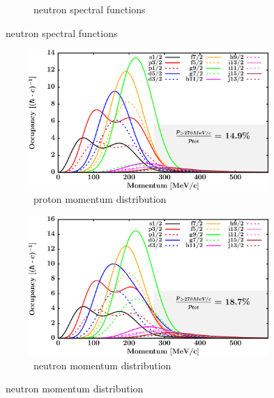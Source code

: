 \begin{figure}[hbtp]
\begin{subfigure}[b]{0.45\textwidth}
        \caption{\snTwelve\ neutron spectral functions}
        \label{DOMFitData_sn112_neutron_spectralFunctions}
    \end{subfigure}
\end{figure}
\afterpage{\clearpage}
\begin{figure}[hbtp]
    \captionsetup[subfigure]{labelformat=empty}
    \centering
    \begin{subfigure}[b]{0.45\textwidth}
        \centering
        \includegraphics[width=\linewidth]{figures/sn112_protonLJMomentumDistIntegral.png}
        \caption{\snTwelve\ proton momentum distribution}
        \label{DOMFitData_sn112_proton_momentumDist}
    \end{subfigure}\hspace{6pt}
    \begin{subfigure}[b]{0.45\textwidth}
        \centering
        \includegraphics[width=\linewidth]{figures/sn112_neutronLJMomentumDistIntegral.png}
        \caption{\snTwelve\ neutron momentum distribution}
        \label{DOMFitData_sn112_neutron_momentumDist}
    \end{subfigure}\vspace{0.3in}

\end{figure}
